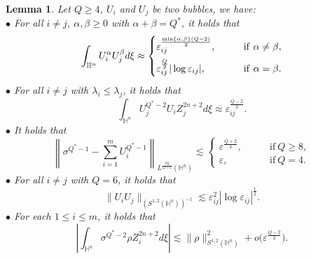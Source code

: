 \documentclass[11pt]{article}
\newtheorem{lemma}{Lemma}[section]
\begin{document}
  \begin{lemma}\label{main0}\cite[(2.9)-(2.10), (3.16), Lemma 2.3]{CFL25}
Let $Q\geq4$, $U_i$ and $U_j$ be two bubbles, we have:
 \\
 $\bullet$ For all $i\neq j$,  $\alpha,\beta\geq0$ with $\alpha+\beta=Q^*$, it holds that
\begin{equation}\label{main00}
  \int_{\mathbb{H}^{n}}U_i^\alpha U_j^\beta d\xi\approx
  \begin{cases}
  \varepsilon_{ij}^{\frac{\min\{\alpha,\beta\}(Q-2)}{2}}, \qquad & \mathrm{if} ~ \alpha\neq\beta, \vspace{.2cm}  \\
  \varepsilon_{ij}^{\frac{Q}{2}}|\log \varepsilon_{ij}|, \qquad & \mathrm{if} ~ \alpha=\beta.
  \end{cases}
\end{equation}
$\bullet$ For all $i\neq j$ with $\lambda_i \leq\lambda_j$, it holds that
\begin{equation}\label{main01}
  \int_{\mathbb{H}^{n}}U_j^{Q^*-2} U_i Z_j^{2n+2} d\xi\approx \varepsilon_{ij}^{\frac{Q-2}{2}}.
\end{equation}
$\bullet$ It holds that
\begin{equation}\label{main02}
 \left\| \sigma^{Q^{*}-1}-\sum\limits_{i=1}^m U_i^{Q^*-1}\right\|_{L^{\frac{2Q}{Q+2}}(\mathbb{H}^{n})} \lesssim
 \begin{cases}
 \varepsilon^{\frac{Q+2}{4}}, \qquad & \mathrm{if} ~ Q\geq8, \\
 \varepsilon, \qquad & \mathrm{if} ~ Q=4.
 \end{cases}
\end{equation}
$\bullet$ For all $i\neq j$ with $Q=6$, it holds that
\begin{equation}\label{main03}
 \|U_i U_j\|_{(S^{1,2}(\mathbb{H}^{n}))^{-1}} \lesssim \varepsilon_{ij}^2 |\log \varepsilon_{ij}|^{\frac{1}{2}}.
\end{equation}
$\bullet$ For each $1\leq i \leq m$, it holds that
\begin{equation}\label{main04}
 \left|\int_{\mathbb{H}^{n}}\sigma^{Q^{\ast}-2}\rho Z_i^{2n+2} d \xi\right| \lesssim\|\rho\|_{S^{1,2}(\mathbb{H}^{n})}^2
+o\Big(\varepsilon^{\frac{Q-2}{2}}\Big).
\end{equation}
  \end{lemma}
\end{document}

